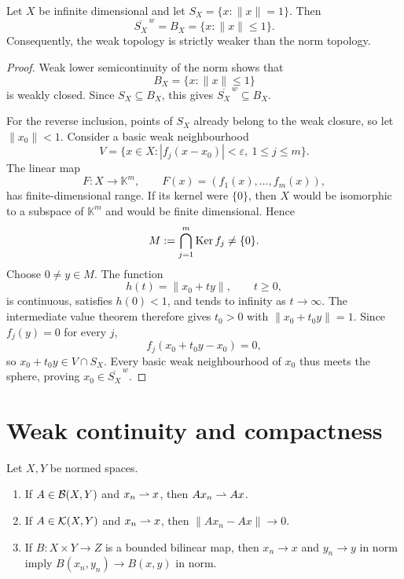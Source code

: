 \begin{notetheorem}
Let $X$ be infinite dimensional and let $S_X=\{x:\|x\|=1\}$.  Then
\[
  \overline{S_X}^{\,w}=B_X=\{x:\|x\|\le1\}.
\]
Consequently, the weak topology is strictly weaker than the norm topology.
\end{notetheorem}

\begin{proof}
Weak lower semicontinuity of the norm shows that
\[
  B_X=\{x:\|x\|\le1\}
\]
is weakly closed.  Since $S_X\subseteq B_X$, this gives
$\overline{S_X}^{\,w}\subseteq B_X$.

For the reverse inclusion, points of $S_X$ already belong to the weak
closure, so let $\|x_0\|<1$.  Consider a basic weak neighbourhood
\[
  V=\{x\in X:|f_j(x-x_0)|<\varepsilon,
                  \ 1\le j\le m\}.
\]
The linear map
\[
  F\colon X\to\mathbb K^m,
  \qquad F(x)=(f_1(x),\ldots,f_m(x)),
\]
has finite-dimensional range.  If its kernel were $\{0\}$, then $X$ would be isomorphic to a subspace of $\mathbb K^m$ and
would be finite dimensional.  Hence
\[
  M:=\bigcap_{j=1}^m\operatorname{Ker} f_j\ne\{0\}.
\]
Choose $0\ne y\in M$.  The function
\[
  h(t)=\|x_0+ty\|,
  \qquad t\ge0,
\]
is continuous, satisfies $h(0)<1$, and tends to infinity as $t\to\infty$.
The intermediate value theorem therefore gives $t_0>0$ with
$\|x_0+t_0y\|=1$.  Since $f_j(y)=0$ for every $j$,
\[
  f_j(x_0+t_0y-x_0)=0,
\]
so $x_0+t_0y\in V\cap S_X$.  Every basic weak neighbourhood of $x_0$ thus
meets the sphere, proving $x_0\in\overline{S_X}^{\,w}$.
\end{proof}

\section{Weak continuity and compactness}

\begin{noteproposition}
Let $X,Y$ be normed spaces.
\begin{enumerate}
  \item If $A\in\mathcal{B}(X,Y)$ and $x_n\rightharpoonup x$, then
        $Ax_n\rightharpoonup Ax$.
  \item If $A\in\mathcal{K}(X,Y)$ and $x_n\rightharpoonup x$, then
        $\|Ax_n-Ax\|\to0$.
  \item If $B\colon X\times Y\to Z$ is a bounded bilinear map, then
        $x_n\to x$ and $y_n\to y$ in norm imply
        $B(x_n,y_n)\to B(x,y)$ in norm.
\end{enumerate}
\end{noteproposition}

